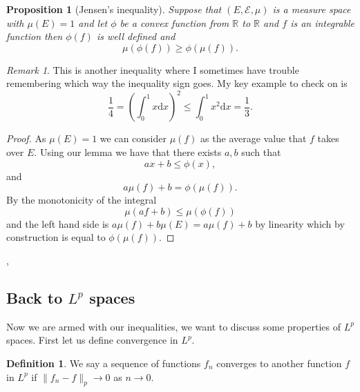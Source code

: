 \documentclass[11pt]{article}
\newtheorem{prp}[thm]{Proposition}
\theoremstyle{definition}
\newtheorem{dfn}[thm]{Definition}
\theoremstyle{remark}
\newtheorem{remark}[thm]{Remark}
\begin{document}
\begin{prp}[Jensen's inequality]
Suppose that $(E, \mathcal{E}, \mu)$ is a measure space with $\mu(E) = 1$ and let $\phi$ be a convex function from $\mathbb{R}$ to $\mathbb{R}$ and $f$ is an integrable function then $\phi(f)$ is well defined and 
\[ \mu(\phi(f)) \geq \phi(\mu(f)). \] 
\end{prp}
\begin{remark}
This is another inequality where I sometimes have trouble remembering which way the inequality sign goes. My key example to check on is \[ \frac{1}{4} = \left( \int_0^1 x \mathrm{d}x \right)^2 \leq \int_0^1 x^2 \mathrm{d}x = \frac{1}{3}. \]
\end{remark}
\begin{proof}
As $\mu(E)=1$ we can consider $\mu(f)$ as the average value that $f$ takes over $E$. Using our lemma we have that there exists $a,b$ such that
\[ ax+b \leq \phi(x), \] and \[a\mu(f)+b = \phi(\mu(f)).\] By the monotonicity of the integral
\[ \mu(af + b) \leq \mu(\phi(f)) \] and the left hand side is $a \mu(f) +b \mu(E)= a \mu(f) +b$ by linearity which by construction is equal to $\phi(\mu(f))$.
\end{proof},

\subsection{Back to $L^p$ spaces}
 Now we are armed with our inequalities, we want to discuss some properties of $L^p$ spaces. First let us define convergence in $L^p$.
\begin{dfn}
We say a sequence of functions $f_n$ converges to another function $f$ in $L^p$ if $\|f_n -f\|_p \rightarrow 0$ as $n \rightarrow 0$.
\end{dfn}
\end{document}
